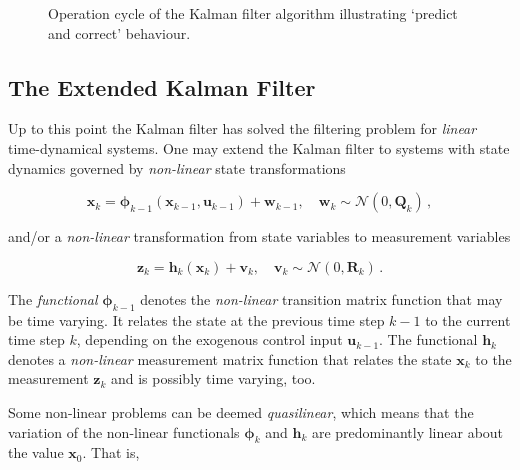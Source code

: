 \begin{figure}[t]
\caption{Operation cycle of the Kalman filter algorithm illustrating `predict and correct' behaviour.} \label{fig:kalman_filter_cycle}
\end{figure}


\subsection{The Extended Kalman Filter}

Up to this point the Kalman filter has solved the filtering problem for \emph{linear} time-dynamical systems. One may extend the Kalman filter to systems with state dynamics governed by \emph{non-linear} state transformations

\begin{equation}\label{eq:time_dynamical_system_plant_extended}
  \mathbf{x}_k = \bm{\phi}_{k-1}(\mathbf{x}_{k-1}, \mathbf{u}_{k-1})+\mathbf{w}_{k-1}, \quad \mathbf{w}_{k} \sim \mathcal{N}(0,\mathbf{Q}_k)\,,
\end{equation}

\noindent
and/or a \emph{non-linear} transformation from state variables to measurement variables

\begin{equation}\label{eq:time_dynamical_system_measurement_extended}
  \mathbf{z}_k = \mathbf{h}_{k}(\mathbf{x}_{k})+\mathbf{v}_{k}, \quad \mathbf{v}_{k} \sim \mathcal{N}(0,\mathbf{R}_k)\,.
\end{equation}

\noindent
The \emph{functional} $\bm{\phi}_{k-1}$ denotes the \emph{non-linear} transition matrix function that may be time varying. It relates the state at the previous time step $k-1$ to the current time step $k$, depending on the exogenous control input $\mathbf{u}_{k-1}$. The functional $\mathbf{h}_{k}$ denotes a \emph{non-linear} measurement matrix function that relates the state $\mathbf{x}_{k}$ to the measurement $\mathbf{z}_k$ and is possibly time varying, too.

Some non-linear problems can be deemed \emph{quasilinear}, which means that the variation of the non-linear functionals $\bm{\phi}_k$ and $\mathbf{h}_k$ are predominantly linear about the value $\mathbf{x}_0$. That is,

